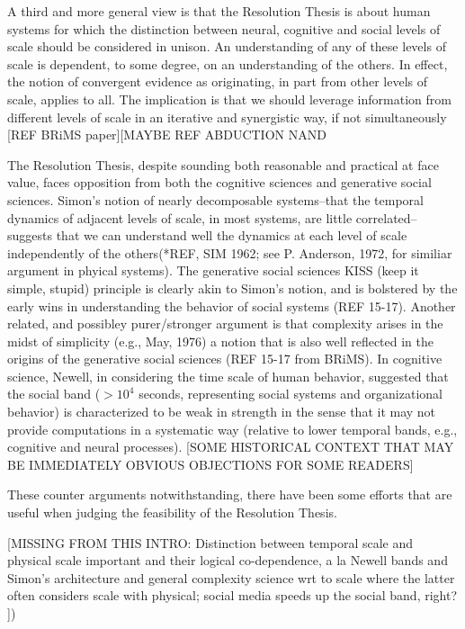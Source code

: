 \documentclass{article}
\begin{document}
A third and more general view is that the Resolution Thesis is about human systems for which the distinction between neural, cognitive and social levels of scale should be considered in unison.  An understanding of any of these levels of scale is dependent, to some degree, on an understanding of the others.  In effect, the notion of convergent evidence as originating, in part from other levels of scale, applies to all.  The implication is that we should leverage information from different levels of scale in an iterative and synergistic way, if not simultaneously [REF BRiMS paper][MAYBE REF ABDUCTION NAND 

The Resolution Thesis, despite sounding both reasonable and practical at face value, faces opposition from both the cognitive sciences and generative social sciences.  Simon's notion of nearly decomposable systems--that the temporal dynamics of adjacent levels of scale, in most systems, are little correlated--suggests that we can understand well the dynamics at each level of scale independently of the others(*REF, SIM 1962; see P. Anderson, 1972, for similiar argument in phyical systems).  The generative social sciences KISS (keep it simple, stupid) principle is clearly akin to Simon's notion, and is bolstered by the early wins in understanding the behavior of social systems (REF 15-17).   Another related, and possibley purer/stronger argument is that complexity arises in the midst of simplicity (e.g., May, 1976) a notion that is also well reflected in the origins of the generative social sciences (REF 15-17 from BRiMS).  In cognitive science, Newell, in considering the time scale of human behavior, suggested that the social band ($> 10^4$ seconds, representing social systems and organizational behavior) is characterized to be weak in strength in the sense that it may not provide computations in a systematic way (relative to lower temporal bands, e.g., cognitive and neural processes).  
[SOME HISTORICAL CONTEXT THAT MAY BE IMMEDIATELY OBVIOUS OBJECTIONS FOR SOME READERS]

These counter arguments notwithstanding, there have been some efforts that are useful when judging the feasibility of the Resolution Thesis.  



[MISSING FROM THIS INTRO:  Distinction between temporal scale and physical scale important and their logical co-dependence, a la Newell bands and Simon's architecture and general complexity science wrt to scale where the latter often considers scale with physical; social media speeds up the social band, right?   ])
\end{document}
